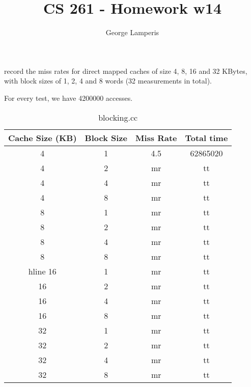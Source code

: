 \documentclass[letterpaper, 12pt, oneside]{memoir}
\title{CS 261 - Homework w14}
\author{George Lamperis}
\date{}
\begin{document}
\maketitle

record the miss rates for direct mapped caches of size 4, 8, 16 and 32 KBytes,
with block sizes of 1, 2, 4 and 8 words (32 measurements in total). 

For every test, we have 4200000 accesses.
\begin{table}[H]
\centering
\begin{tabular}{c|c|c|c}
    Cache Size (KB)  & Block Size & Miss Rate & Total time \\ \hline 
    4  & 1 & 4.5 & 62865020 \\
    4  & 2 & mr & tt \\
    4  & 4 & mr & tt \\
    4  & 8 & mr & tt \\ \hline
    8  & 1 & mr & tt \\
    8  & 2 & mr & tt \\
    8  & 4 & mr & tt \\
    8  & 8 & mr & tt \\ hline
    16 & 1 & mr & tt \\
    16 & 2 & mr & tt \\
    16 & 4 & mr & tt \\
    16 & 8 & mr & tt \\ \hline
    32 & 1 & mr & tt \\
    32 & 2 & mr & tt \\
    32 & 4 & mr & tt \\
    32 & 8 & mr & tt \\
\end{tabular}
\caption{blocking.cc}
\end{table}
\end{document}
